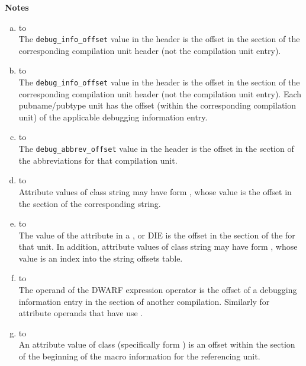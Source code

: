 \clearpage
\begin{center}
   \textbf{Notes}
\end{center}
\begin{enumerate}[(a)]  
\item  \dotdebugaranges{} to \dotdebuginfo \\
The \texttt{debug\_info\_offset} value in
the header is
the offset in the \dotdebuginfo{} section of the
corresponding compilation unit header (not the compilation
unit entry).

\item \dotdebugnames{} to \dotdebuginfo \\
The \texttt{debug\_info\_offset} value in the header is the offset in the
\dotdebuginfo{} section of the 
corresponding compilation unit header (not
the compilation unit entry). Each pubname/pubtype unit has the offset (within
the corresponding compilation unit) of the applicable debugging
information entry.

\item \dotdebuginfo{} to \dotdebugabbrev \\
The \texttt{debug\_abbrev\_offset} value in the header is the offset in the
\dotdebugabbrev{} 
section of the abbreviations for that compilation unit.

\item  \dotdebuginfo{} to \dotdebugstr \\
Attribute values of class string may have form 
\DWFORMstrp, whose
value is the offset in the \dotdebugstr{}
section of the corresponding string.

\item \dotdebugstroffsets{} to \dotdebugstroffsets \\
The value of the \DWATstroffsetsbase{} attribute in a
\DWTAGcompileunit{}, \DWTAGtypeunit{} or \DWTAGpartialunit{} 
DIE is the offset in the
\dotdebugstroffsets{} section of the 
for that unit.
In addition, attribute values of class string may have form 
\DWFORMstrx, whose value is an index into the
string offsets table.

\item \dotdebuginfo{} to \dotdebuginfo \\
The operand of the \DWOPcallref{} 
DWARF expression operator is the
offset of a debugging information entry in the 
\dotdebuginfo{} section of another compilation.
Similarly for attribute operands that have use
\DWFORMrefaddr.

\item \dotdebuginfo{} to \dotdebugmacro \\
An attribute value of class 
 (specifically form
\DWFORMsecoffset) is an 
offset within the 
\dotdebugmacro{} section
of the beginning of the macro information for the referencing unit.


\end{enumerate}
